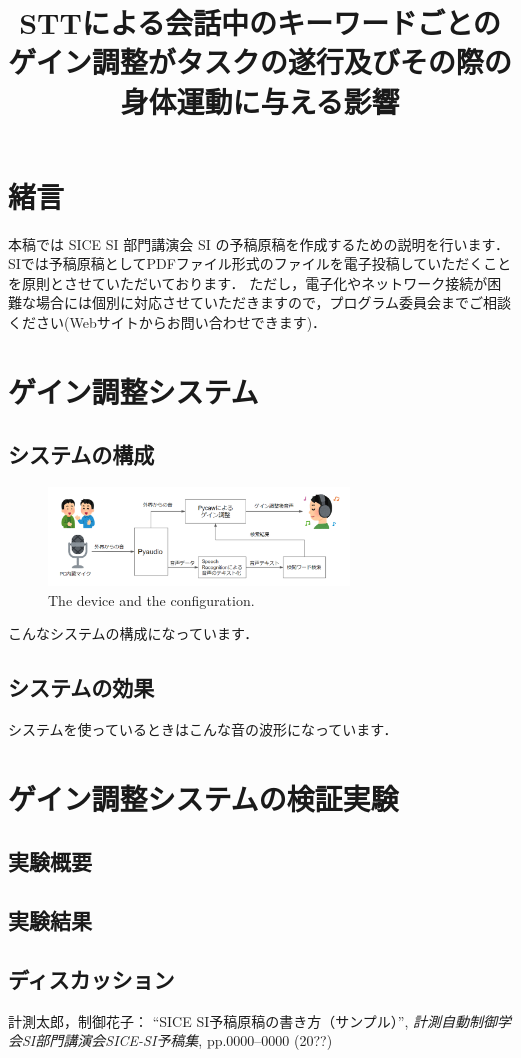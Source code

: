 \documentclass[a4paper]{jarticle}
\begin{document}
%
\title{STTによる会話中のキーワードごとのゲイン調整がタスクの遂行及びその際の身体運動に与える影響} %
%
\maketitle
%
\section{緒言}
本稿では SICE SI 部門講演会 SI の予稿原稿を作成するための説明を行います．
SIでは予稿原稿としてPDFファイル形式のファイルを電子投稿していただくことを原則とさせていただいております．
ただし，電子化やネットワーク接続が困難な場合には個別に対応させていただきますので，プログラム委員会までご相談ください(Webサイトからお問い合わせできます)．
%
\section{ゲイン調整システム}
\subsection{システムの構成}
\begin{figure}[htbp]
    \begin{center}
    \includegraphics[width=80mm]{system.PNG}
    \caption{The device and the configuration.}
    \end{center}
    \end{figure}

こんなシステムの構成になっています．
\subsection{システムの効果}
    
システムを使っているときはこんな音の波形になっています．
\section{ゲイン調整システムの検証実験}
\subsection{実験概要}
\subsection{実験結果}
\subsection{ディスカッション}
%
%
\begin{thebibliography}{99}
	計測太郎，制御花子：
	``SICE SI予稿原稿の書き方（サンプル）'',  
   {\it 計測自動制御学会SI部門講演会SICE-SI予稿集}, 
    pp.0000--0000 (20??)
\end{thebibliography}
%
%
%
\end{document}
